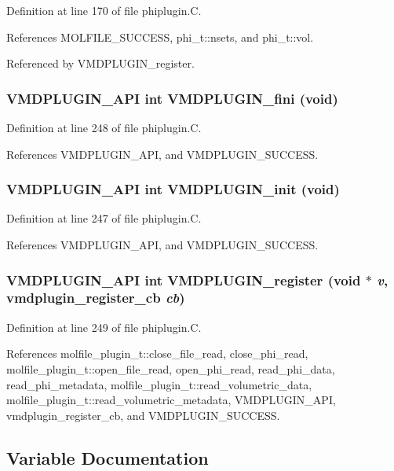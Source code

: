 Definition at line 170 of file phiplugin.C.

References MOLFILE\_\-SUCCESS, phi\_\-t::nsets, and phi\_\-t::vol.

Referenced by VMDPLUGIN\_\-register.
\subsubsection{\setlength{\rightskip}{0pt plus 5cm}VMDPLUGIN\_\-API int VMDPLUGIN\_\-fini (void)}\label{phiplugin_8C_a8}




Definition at line 248 of file phiplugin.C.

References VMDPLUGIN\_\-API, and VMDPLUGIN\_\-SUCCESS.
\subsubsection{\setlength{\rightskip}{0pt plus 5cm}VMDPLUGIN\_\-API int VMDPLUGIN\_\-init (void)}\label{phiplugin_8C_a7}




Definition at line 247 of file phiplugin.C.

References VMDPLUGIN\_\-API, and VMDPLUGIN\_\-SUCCESS.
\subsubsection{\setlength{\rightskip}{0pt plus 5cm}VMDPLUGIN\_\-API int VMDPLUGIN\_\-register (void $\ast$ {\em v}, {\bf vmdplugin\_\-register\_\-cb} {\em cb})}\label{phiplugin_8C_a9}




Definition at line 249 of file phiplugin.C.

References molfile\_\-plugin\_\-t::close\_\-file\_\-read, close\_\-phi\_\-read, molfile\_\-plugin\_\-t::open\_\-file\_\-read, open\_\-phi\_\-read, read\_\-phi\_\-data, read\_\-phi\_\-metadata, molfile\_\-plugin\_\-t::read\_\-volumetric\_\-data, molfile\_\-plugin\_\-t::read\_\-volumetric\_\-metadata, VMDPLUGIN\_\-API, vmdplugin\_\-register\_\-cb, and VMDPLUGIN\_\-SUCCESS.

\subsection{Variable Documentation}
